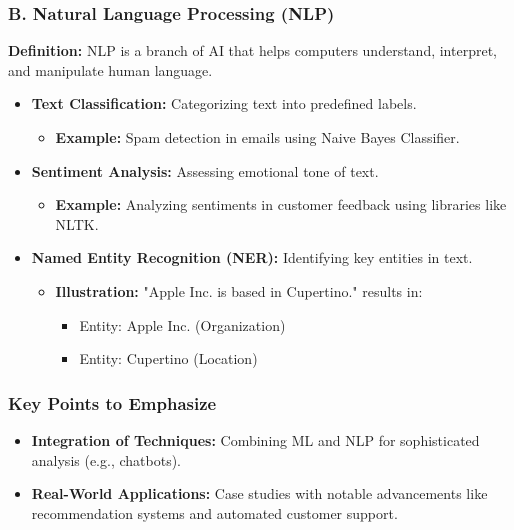\documentclass[aspectratio=169]{beamer}
\begin{document}
\begin{frame}
    \frametitle{B. Natural Language Processing (NLP)}
    \textbf{Definition:} NLP is a branch of AI that helps computers understand, interpret, and manipulate human language.
    \begin{itemize}
        \item \textbf{Text Classification:} Categorizing text into predefined labels.
        \begin{itemize}
            \item \textbf{Example:} Spam detection in emails using Naive Bayes Classifier.
        \end{itemize}
        \item \textbf{Sentiment Analysis:} Assessing emotional tone of text.
        \begin{itemize}
            \item \textbf{Example:} Analyzing sentiments in customer feedback using libraries like NLTK.
        \end{itemize}
        \item \textbf{Named Entity Recognition (NER):} Identifying key entities in text.
        \begin{itemize}
            \item \textbf{Illustration:} "Apple Inc. is based in Cupertino." results in: 
            \begin{itemize}
                \item Entity: Apple Inc. (Organization)
                \item Entity: Cupertino (Location)
            \end{itemize}
        \end{itemize}
    \end{itemize}
\end{frame}

\begin{frame}
    \frametitle{Key Points to Emphasize}
    \begin{itemize}
        \item \textbf{Integration of Techniques:} Combining ML and NLP for sophisticated analysis (e.g., chatbots).
        \item \textbf{Real-World Applications:} Case studies with notable advancements like recommendation systems and automated customer support.
    \end{itemize}
\end{frame}
\end{document}
